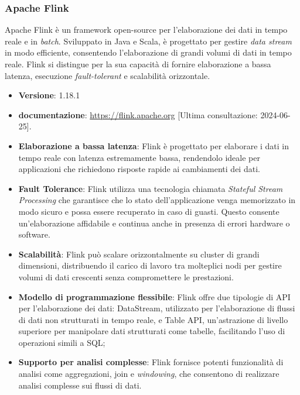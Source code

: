 \subsubsection{Apache Flink} \label{sec:flink}
Apache Flink è un framework open-source per l'elaborazione dei dati in tempo reale e in \textit{batch}.
Sviluppato in Java e Scala, è progettato per gestire \textit{data stream} in modo efficiente, consentendo l'elaborazione di grandi volumi di dati in tempo reale.
Flink si distingue per la sua capacità di fornire elaborazione a bassa latenza, esecuzione \textit{fault-tolerant} e scalabilità orizzontale.

\begin{itemize}
	\item \textbf{Versione}: 1.18.1
	\item \textbf{documentazione}: \url{https://flink.apache.org} [Ultima consultazione: 2024-06-25].
\end{itemize}

\begin{itemize}
	\item \textbf{Elaborazione a bassa latenza}: Flink è progettato per elaborare i dati in tempo reale con latenza estremamente bassa, rendendolo ideale per applicazioni che richiedono risposte rapide ai cambiamenti dei dati.
	\item \textbf{Fault Tolerance}: Flink utilizza una tecnologia chiamata \textit{Stateful Stream Processing} che garantisce che lo stato dell'applicazione venga memorizzato in modo sicuro e possa essere recuperato in caso di guasti. Questo consente un'elaborazione affidabile e continua anche in presenza di errori hardware o software.
	\item \textbf{Scalabilità}: Flink può scalare orizzontalmente su cluster di grandi dimensioni, distribuendo il carico di lavoro tra molteplici nodi per gestire volumi di dati crescenti senza compromettere le prestazioni.
	\item \textbf{Modello di programmazione flessibile}: Flink offre due tipologie di API per l'elaborazione dei dati: DataStream, utilizzato per l'elaborazione di flussi di dati non strutturati in tempo reale, e Table API, un'astrazione di livello superiore per manipolare dati strutturati come tabelle, facilitando l'uso di operazioni simili a SQL;
	\item \textbf{Supporto per analisi complesse}: Flink fornisce potenti funzionalità di analisi come aggregazioni, join e \textit{windowing}, che consentono di realizzare analisi complesse sui flussi di dati.
\end{itemize}

